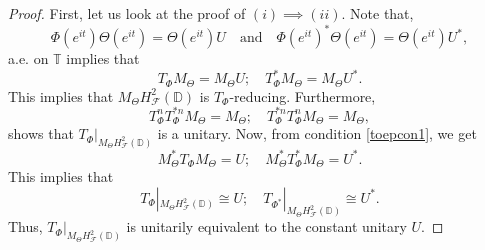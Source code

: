 \documentclass[12pt]{amsart}
\numberwithin{equation}{section}
\theoremstyle{definition}
\newcommand{\D}{\mathbb{D}}
\newcommand{\T}{\mathbb{T}}
\newcommand{\1}{{\mbox{\bf 1}}}
\newcommand{\clf}{\mathcal{F}}
\begin{document}
\begin{proof}
First, let us look at the proof of $(i) \implies (ii)$.  Note that, 
\begin{equation}
\Phi(e^{it}) \Theta(e^{it}) = \Theta(e^{it}) U \quad \text{and} \quad  \Phi(e^{it})^* \Theta(e^{it}) = \Theta(e^{it}) U^*,
\end{equation}
a.e. on $\T$ implies that 
\begin{equation}\label{toepcon1}
T_{\Phi} M_{\Theta} = M_{\Theta} U; \quad T_{\Phi}^* M_{\Theta} = M_{\Theta} U^*.
\end{equation}
This implies that $M_{\Theta} H_{\clf}^2(\D)$ is $T_{\Phi}$-reducing. Furthermore, 
\[
T_{\Phi}^n  T_{\Phi}^{*n} M_{\Theta} = M_{\Theta}; \quad T_{\Phi}^{*n}  T_{\Phi}^{n} M_{\Theta} = M_{\Theta},
\]
shows that $T_{\Phi}|_{M_{\Theta}H_{\clf}^2(\D)}$ is a unitary.  Now, from condition \ref{toepcon1}, we get
\[
M_{\Theta}^* T_{\Phi} M_{\Theta} = U; \quad M_{\Theta}^* T_{\Phi}^* M_{\Theta} = U^*.
\]
This implies that 
\[
T_{\Phi}|_{M_{\Theta} H_{\clf}^2(\D)} \cong U; \quad T_{\Phi^*}|_{M_{\Theta} H_{\clf}^2(\D)} \cong U^*.
\]
Thus, $T_{\Phi}|_{M_{\Theta} H_{\clf}^2(\D)}$ is unitarily equivalent to the constant unitary $U$.


\end{proof}
\end{document}
